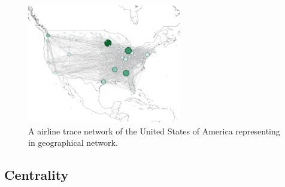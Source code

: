 \documentclass[12pt]{article}
\begin{document}
\begin{figure}
\centering
\includegraphics[width=0.6\textwidth]{fig_2.png}
\caption{\label{fig:fig_2}A airline trace network of the United States of America representing in geographical network\cite{11}.}
\end{figure}

\subsection{Centrality}
\end{document}
